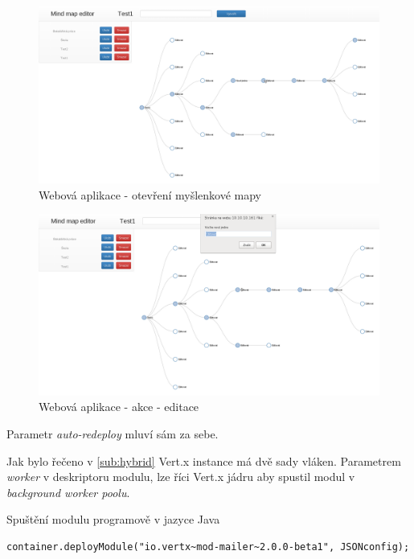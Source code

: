 \begin{figure}
\begin{centering}
\includegraphics[width	=1\textwidth]{obrazky/mindmap2}
\par\end{centering}
\caption{Webová aplikace - otevření myšlenkové mapy\label{fig:midnmap2}}
\end{figure}

\begin{figure}
\begin{centering}
\includegraphics[width	=1\textwidth]{obrazky/mindmap3}
\par\end{centering}
\caption{Webová aplikace - akce - editace\label{fig:midnmap3}}
\end{figure}

Parametr \emph{auto-redeploy} mluví sám za sebe.

Jak bylo řečeno v \ref{sub:hybrid} Vert.x instance má dvě sady vláken. Parametrem \emph{worker} v deskriptoru modulu, lze říci Vert.x jádru aby spustil modul v \emph{background worker poolu}. 

Spuštění modulu programově v jazyce Java
\begin{lstlisting}
container.deployModule("io.vertx~mod-mailer~2.0.0-beta1", JSONconfig);
\end{lstlisting}

